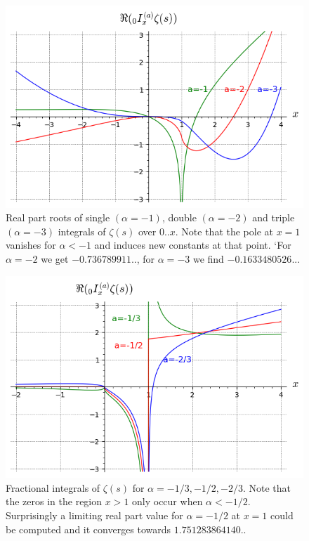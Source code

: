 \documentclass[a4paper,11pt,twoside]{amsart}
\begin{document}
\begin{figure}[H]
  \includegraphics[width=0.9\linewidth]{fracintzeta.png}
  \caption{Real part roots of single $(\alpha=-1)$, double $(\alpha=-2)$ and triple $(\alpha=-3)$ integrals of $\zeta(s)$ over $0..x$. Note that the pole at $x=1$ vanishes for $\alpha < -1$ and induces new constants at that point. `For $\alpha=-2$ we get $-0.736789911..$, for $\alpha=-3$ we find $-0.1633480526...$}
\end{figure}


\begin{figure}[H]
  \includegraphics[width=0.9\linewidth]{fracintzeta1.png}
  \caption{Fractional integrals of $\zeta(s)$ for $\alpha=-1/3, -1/2, -2/3$. Note that the zeros in the region $x > 1$ only occur when $\alpha < -1/2$. Surprisingly a limiting real part value for $\alpha=-1/2$ at $x=1$ could be computed and it converges towards $1.751283864140..$}
\end{figure}
\end{document}
